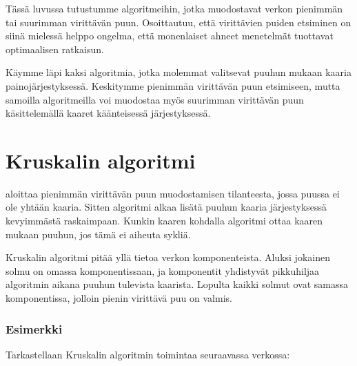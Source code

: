 Tässä luvussa tutustumme algoritmeihin,
jotka muodostavat verkon pienimmän tai suurimman
virittävän puun.
Osoittautuu, että virittävien puiden etsiminen
on siinä mielessä helppo ongelma,
että monenlaiset ahneet menetelmät tuottavat
optimaalisen ratkaisun.

Käymme läpi kaksi algoritmia, jotka molemmat valitsevat
puuhun mukaan kaaria painojärjestyksessä.
Keskitymme pienimmän virittävän puun etsimiseen,
mutta samoilla algoritmeilla voi muodostaa myös suurimman virittävän
puun käsittelemällä kaaret käänteisessä järjestyksessä.

\section{Kruskalin algoritmi}


 aloittaa pienimmän
virittävän
puun muodostamisen tilanteesta,
jossa puussa ei ole yhtään kaaria.
Sitten algoritmi alkaa lisätä
puuhun kaaria järjestyksessä
kevyimmästä raskaimpaan.
Kunkin kaaren kohdalla
algoritmi ottaa kaaren mukaan puuhun,
jos tämä ei aiheuta sykliä.

Kruskalin algoritmi pitää yllä
tietoa verkon komponenteista.
Aluksi jokainen solmu on omassa
komponentissaan,
ja komponentit yhdistyvät pikkuhiljaa
algoritmin aikana puuhun tulevista kaarista.
Lopulta kaikki solmut ovat samassa
komponentissa, jolloin pienin virittävä puu on valmis.

\subsubsection{Esimerkki}

\begin{samepage}
Tarkastellaan Kruskalin algoritmin toimintaa
seuraavassa verkossa:
\begin{center}
\end{center}
\end{samepage}

